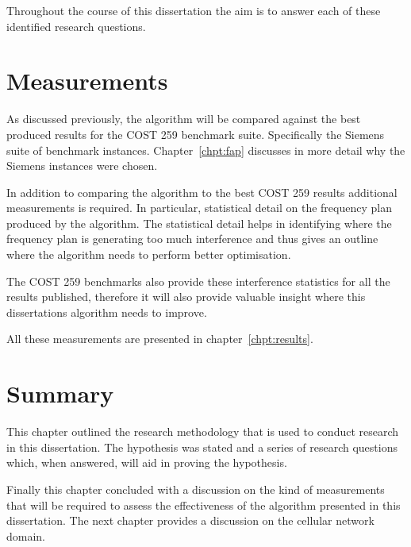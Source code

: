 Throughout the course of this dissertation the aim is to answer each of these identified research questions. 

\section{Measurements}
As discussed previously, the algorithm will be compared against the best produced results for the \gls{COST} 259 benchmark suite. Specifically the Siemens suite of benchmark instances. Chapter~\ref{chpt:fap} discusses in more detail why the Siemens instances were chosen.

In addition to comparing the algorithm to the best \gls{COST} 259 results additional measurements is required. In particular, statistical detail on the frequency plan produced by the algorithm. The statistical detail helps in identifying where the frequency plan is generating too much interference and thus gives an outline where the algorithm needs to perform better optimisation.

The \gls{COST} 259 benchmarks also provide these interference statistics for all the results published, therefore it will also provide valuable insight where this dissertations algorithm needs to improve.

All these measurements are presented in chapter~\ref{chpt:results}.
\section{Summary}
This chapter outlined the research methodology that is used to conduct research in this dissertation. The hypothesis was stated and a series of research questions which, when answered, will aid in proving the hypothesis.

Finally this chapter concluded with a discussion on the kind of measurements that will be required to assess the effectiveness of the algorithm presented in this dissertation. The next chapter provides a discussion on the cellular network domain.

